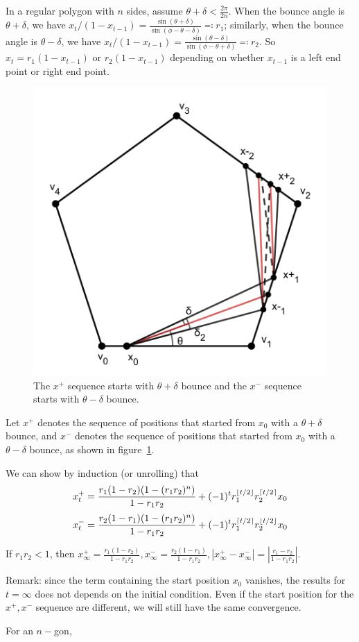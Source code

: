 \documentclass[11pt]{article}%
\begin{document}
In a regular polygon with $n$ sides, assume $\theta + \delta < \frac{2\pi}{2n}$. When the bounce angle is $\theta + \delta$, we have $x_{t} / (1-x_{t-1}) = \frac{\sin(\theta + \delta)}{\sin(\phi - \theta - \delta)} \eqqcolon r_{1}$; similarly, when the bounce angle is $\theta - \delta$, we have $x_{t} / (1-x_{t-1}) = \frac{\sin(\theta - \delta)}{\sin(\phi - \theta + \delta)} \eqqcolon r_{2}$. So $x_{t} = r_{1}(1-x_{t-1})$ or $r_{2}(1-x_{t-1})$ depending on whether $x_{t-1}$ is a left end point or right end point. 
\begin{figure}[!h]
  \centering
  \includegraphics[width=0.5\linewidth]{plus_minus_bounce.png}
  \caption{The $x^{+}$ sequence starts with $\theta+\delta$ bounce and the $x^{-}$ sequence starts with $\theta-\delta$ bounce.}
  \label{fig:plus_minus_bounce}
\end{figure}
Let $x^{+}$ denotes the sequence of positions that started from $x_{0}$ with a $\theta+\delta$ bounce, and $x^{-}$ denotes the sequence of positions that started from $x_{0}$ with a $\theta-\delta$ bounce, as shown in figure~\ref{fig:plus_minus_bounce}. 

We can show by induction (or unrolling) that 
\[x^{+}_{t} = \frac{r_{1}(1-r_{2})(1-(r_{1}r_{2})^{n})}{1-r_{1}r_{2}} + (-1)^{t}r_{1}^{\lfloor t/2 \rfloor}r_{2}^{\lceil t/2 \rceil}x_0\]
\[x^{-}_{t} = \frac{r_{2}(1-r_{1})(1-(r_{1}r_{2})^{n})}{1-r_{1}r_{2}} + (-1)^{t}r_{1}^{\lceil t/2 \rceil}r_{2}^{\lfloor t/2 \rfloor}x_0\]


If $r_{1}r_{2}<1$, then $x^{+}_{\infty} = \frac{r_{1}(1-r_{2})}{1-r_{1}r_{2}}, x^{-}_{\infty} = \frac{r_{2}(1-r_{1})}{1-r_{1}r_{2}}, |x^{+}_{\infty} - x^{-}_{\infty}| = |\frac{r_{1}-r_{2}}{1-r_{1}r_{2}}|$. 

Remark: since the term containing the start position $x_{0}$ vanishes, the results for $t = \infty$ does not depends on the initial condition. Even if the start position for the $x^{+}, x^{-}$ sequence are different, we will still have the same convergence. 

For an $n-$gon, 
\end{document}
